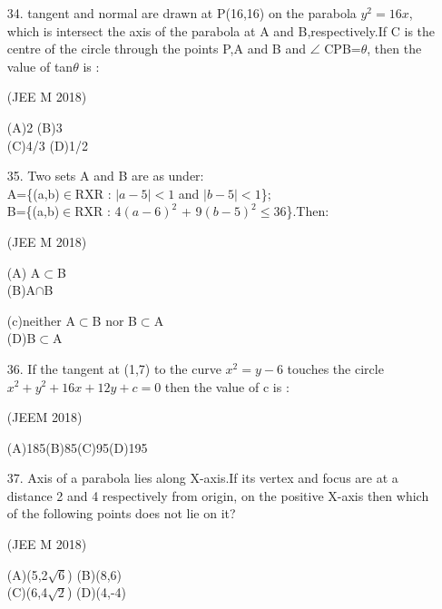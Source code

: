 \documentclass[journal,12pt,twocolumn]{IEEEtran}
\theoremstyle{remark}
\begin{document}
\begin{enumerate}
\item[34.] tangent and normal are drawn at P(16,16) on the parabola $y^2=16x$,
which is intersect the axis of the parabola at A and B,respectively.If C is the centre of the circle through the points P,A and B and $\angle$ CPB=$\theta$, then the value of tan$\theta$ is :

     \hfill{(JEE M 2018)}

     (A)2    \hspace{2cm}  (B)3\\

     (C)4/3  \hspace{2cm}(D)1/2\\

\item[35.]  Two sets A and B are as under:\\
A=\{(a,b)$\in$RXR : $|{a-5}|<1$ and $|{b-5}|<1$\};\\
B=\{(a,b)$\in$RXR : 4$(a-6)^2$ + 9$(b-5)^2$$\leq$36\}.Then:

    \hfill{(JEE M 2018)}

    (A) A$\subset$B \\   (B)A$\cap$B

    (c)neither A$\subset$B nor B$\subset$A\\
    (D)B$\subset$A\\

\item[36.] If the tangent at (1,7) to the curve $x^2=y-6$ touches the circle $x^2+y^2+16x+12y+c=0$ then the value of c is :

     \hfill{(JEEM 2018)}

    (A)185\hspace{1cm}(B)85\hspace{1cm}(C)95\hspace{1cm}(D)195\\

\item[37.] Axis of a parabola lies along X-axis.If its vertex and focus are at a distance 2 and 4 respectively from origin, on the positive X-axis then which of the following points does not lie on it? 

     \hfill{(JEE M 2018)}

    (A)(5,2$\sqrt6$)\hspace{2cm}  (B)(8,6)\\

    (C)(6,4$\sqrt2$)\hspace{2cm}   (D)(4,-4)\\


\end{enumerate}
\end{document}
